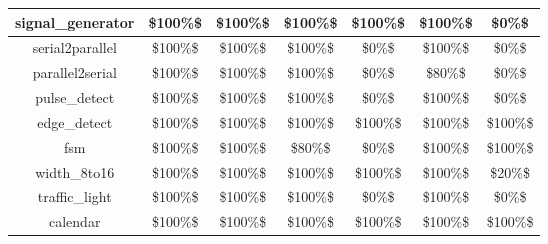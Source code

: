 \begin{tabular}{c|cc|cc|cc}
signal\_generator & \color{black} {\cellcolor{lightblue}} \$100\%\$ & \color{black} {\cellcolor{lightgreen}} \$100\%\$ & \color{black} {\cellcolor{lightblue}} \$100\%\$ & \color{black} {\cellcolor{lightgreen}} \$100\%\$ & \color{black} {\cellcolor{lightblue}} \$100\%\$ & \$0\%\$ \\ \midrule
serial2parallel & \color{black} {\cellcolor{lightblue}} \$100\%\$ & \color{black} {\cellcolor{lightgreen}} \$100\%\$ & \color{black} {\cellcolor{lightblue}} \$100\%\$ & \$0\%\$ & \color{black} {\cellcolor{lightblue}} \$100\%\$ & \$0\%\$ \\ \midrule
parallel2serial & \color{black} {\cellcolor{lightblue}} \$100\%\$ & \color{black} {\cellcolor{lightgreen}} \$100\%\$ & \color{black} {\cellcolor{lightblue}} \$100\%\$ & \$0\%\$ & \$80\%\$ & \$0\%\$ \\ \midrule
pulse\_detect & \color{black} {\cellcolor{lightblue}} \$100\%\$ & \color{black} {\cellcolor{lightgreen}} \$100\%\$ & \color{black} {\cellcolor{lightblue}} \$100\%\$ & \$0\%\$ & \color{black} {\cellcolor{lightblue}} \$100\%\$ & \$0\%\$ \\ \midrule
edge\_detect & \color{black} {\cellcolor{lightblue}} \$100\%\$ & \color{black} {\cellcolor{lightgreen}} \$100\%\$ & \color{black} {\cellcolor{lightblue}} \$100\%\$ & \color{black} {\cellcolor{lightgreen}} \$100\%\$ & \color{black} {\cellcolor{lightblue}} \$100\%\$ & \color{black} {\cellcolor{lightgreen}} \$100\%\$ \\ \midrule
fsm & \color{black} {\cellcolor{lightblue}} \$100\%\$ & \color{black} {\cellcolor{lightgreen}} \$100\%\$ & \$80\%\$ & \$0\%\$ & \color{black} {\cellcolor{lightblue}} \$100\%\$ & \color{black} {\cellcolor{lightgreen}} \$100\%\$ \\ \midrule
width\_8to16 & \color{black} {\cellcolor{lightblue}} \$100\%\$ & \color{black} {\cellcolor{lightgreen}} \$100\%\$ & \color{black} {\cellcolor{lightblue}} \$100\%\$ & \color{black} {\cellcolor{lightgreen}} \$100\%\$ & \color{black} {\cellcolor{lightblue}} \$100\%\$ & \$20\%\$ \\ \midrule
traffic\_light & \color{black} {\cellcolor{lightblue}} \$100\%\$ & \color{black} {\cellcolor{lightgreen}} \$100\%\$ & \color{black} {\cellcolor{lightblue}} \$100\%\$ & \$0\%\$ & \color{black} {\cellcolor{lightblue}} \$100\%\$ & \$0\%\$ \\ \midrule
calendar & \color{black} {\cellcolor{lightblue}} \$100\%\$ & \color{black} {\cellcolor{lightgreen}} \$100\%\$ & \color{black} {\cellcolor{lightblue}} \$100\%\$ & \color{black} {\cellcolor{lightgreen}} \$100\%\$ & \color{black} {\cellcolor{lightblue}} \$100\%\$ & \color{black} {\cellcolor{lightgreen}} \$100\%\$ \\ \midrule

\end{tabular}
